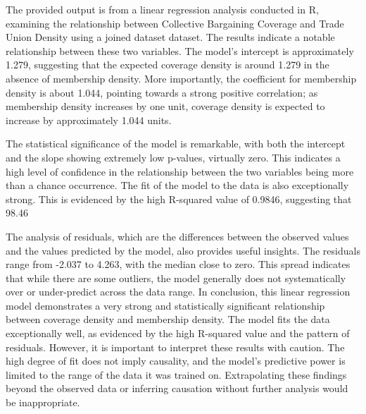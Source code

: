 \documentclass[11pt]{article}\usepackage[]{graphicx}\usepackage[]{xcolor}
\begin{document}
The provided output is from a linear regression analysis conducted in R, examining the relationship between Collective Bargaining Coverage and Trade Union Density using a joined dataset dataset. The results indicate a notable relationship between these two variables. The model's intercept is approximately 1.279, suggesting that the expected coverage density is around 1.279 in the absence of membership density. More importantly, the coefficient for membership density is about 1.044, pointing towards a strong positive correlation; as membership density increases by one unit, coverage density is expected to increase by approximately 1.044 units.

The statistical significance of the model is remarkable, with both the intercept and the slope showing extremely low p-values, virtually zero. This indicates a high level of confidence in the relationship between the two variables being more than a chance occurrence. The fit of the model to the data is also exceptionally strong. This is evidenced by the high R-squared value of 0.9846, suggesting that 98.46%

The analysis of residuals, which are the differences between the observed values and the values predicted by the model, also provides useful insights. The residuals range from -2.037 to 4.263, with the median close to zero. This spread indicates that while there are some outliers, the model generally does not systematically over or under-predict across the data range. In conclusion, this linear regression model demonstrates a very strong and statistically significant relationship between coverage density and membership density. The model fits the data exceptionally well, as evidenced by the high R-squared value and the pattern of residuals. However, it is important to interpret these results with caution. The high degree of fit does not imply causality, and the model's predictive power is limited to the range of the data it was trained on. Extrapolating these findings beyond the observed data or inferring causation without further analysis would be inappropriate.
\end{document}
